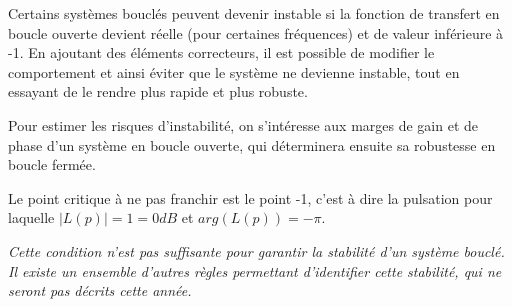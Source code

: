 \documentclass[a4paper,french]{paper}
\begin{document}
Certains systèmes bouclés peuvent devenir instable si la fonction de transfert en boucle ouverte devient réelle (pour certaines fréquences) et de valeur inférieure à -1. En ajoutant des éléments correcteurs, il est possible de modifier le comportement et ainsi éviter que le système ne devienne instable, tout en essayant de le rendre plus rapide et plus robuste. 

Pour estimer les risques d'instabilité, on s'intéresse aux marges de gain et de phase d'un système en boucle ouverte, qui déterminera ensuite sa robustesse en boucle fermée.

Le point critique à ne pas franchir est le point -1, c'est à dire la pulsation pour laquelle $\lvert L(p) \rvert = 1 = 0dB$ et $arg(L(p)) = -\pi$. 

\qquad

\textit{Cette condition n'est pas suffisante pour garantir la stabilité d'un système bouclé. Il existe un ensemble d'autres règles permettant d'identifier cette stabilité, qui ne seront pas décrits cette année.}



\end{document}
